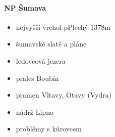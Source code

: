 \paragraph{NP Šumava}
\begin{itemize}
\item nejvyšší vrchol pPlechý 1378m
\item šumavské slatě a pláne
\item ledovcová jezera
\item prales Boubín
\item pramen Vltavy, Otavy (Vydra)
\item nádrž Lipno
\item problémy s kůrovcem
\end{itemize}

